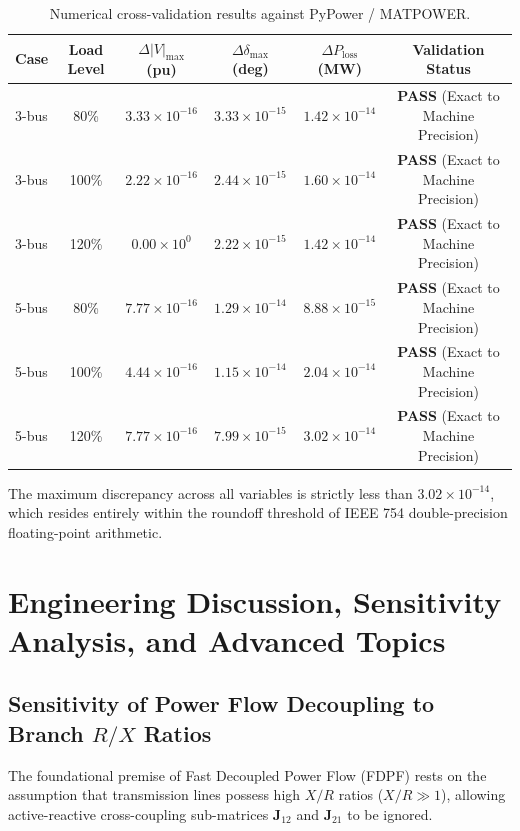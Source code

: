 \documentclass[12pt,a4paper,oneside]{report}
\begin{document}
\begin{table}[htbp]
\centering
\caption{Numerical cross-validation results against PyPower / MATPOWER.}
\label{tab:pypower_bench}
\small
\begin{tabular}{lccccc}
\toprule
\textbf{Case} & \textbf{Load Level} & $\Delta |V|_{\max}$ \textbf{(pu)} & $\Delta \delta_{\max}$ \textbf{(deg)} & $\Delta P_{\text{loss}}$ \textbf{(MW)} & \textbf{Validation Status} \\
\midrule
3-bus & 80\% & $3.33 \times 10^{-16}$ & $3.33 \times 10^{-15}$ & $1.42 \times 10^{-14}$ & \textbf{PASS} (Exact to Machine Precision) \\
3-bus & 100\% & $2.22 \times 10^{-16}$ & $2.44 \times 10^{-15}$ & $1.60 \times 10^{-14}$ & \textbf{PASS} (Exact to Machine Precision) \\
3-bus & 120\% & $0.00 \times 10^{0}$ & $2.22 \times 10^{-15}$ & $1.42 \times 10^{-14}$ & \textbf{PASS} (Exact to Machine Precision) \\
5-bus & 80\% & $7.77 \times 10^{-16}$ & $1.29 \times 10^{-14}$ & $8.88 \times 10^{-15}$ & \textbf{PASS} (Exact to Machine Precision) \\
5-bus & 100\% & $4.44 \times 10^{-16}$ & $1.15 \times 10^{-14}$ & $2.04 \times 10^{-14}$ & \textbf{PASS} (Exact to Machine Precision) \\
5-bus & 120\% & $7.77 \times 10^{-16}$ & $7.99 \times 10^{-15}$ & $3.02 \times 10^{-14}$ & \textbf{PASS} (Exact to Machine Precision) \\
\bottomrule
\end{tabular}
\end{table}

The maximum discrepancy across all variables is strictly less than $3.02 \times 10^{-14}$, which resides entirely within the roundoff threshold of IEEE 754 double-precision floating-point arithmetic.

\chapter{Engineering Discussion, Sensitivity Analysis, and Advanced Topics}

\section{Sensitivity of Power Flow Decoupling to Branch $R/X$ Ratios}
The foundational premise of Fast Decoupled Power Flow (FDPF) rests on the assumption that transmission lines possess high $X/R$ ratios ($X/R \gg 1$), allowing active-reactive cross-coupling sub-matrices $\mathbf{J}_{12}$ and $\mathbf{J}_{21}$ to be ignored.
\end{document}
